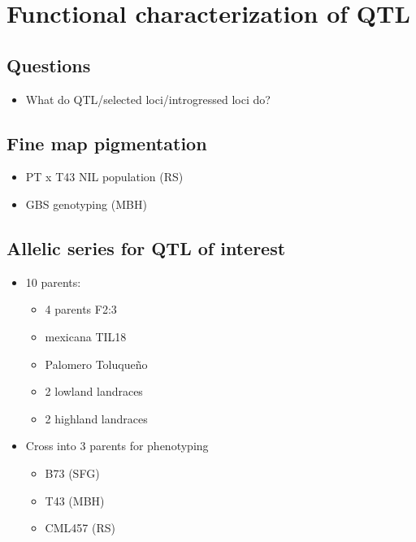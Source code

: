 \section{Functional characterization of QTL}

\subsection{Questions}
\begin{itemize}
\item What do QTL/selected loci/introgressed loci do?
\end{itemize}

\subsection{Fine map pigmentation}
\begin{itemize}
\item PT x T43 NIL population (RS)
\item GBS genotyping (MBH)
\end{itemize}

\subsection{Allelic series for QTL of interest}
\begin{itemize}
\item 10 parents:
\begin{itemize}
\item 4 parents F2:3
\item mexicana TIL18
\item Palomero Toluqueño
\item 2 lowland landraces
\item 2 highland landraces
\end{itemize}
\item Cross into 3 parents for phenotyping
\begin{itemize}
\item B73 (SFG)
\item T43 (MBH)
\item CML457 (RS)
\end{itemize}
\end{itemize}

